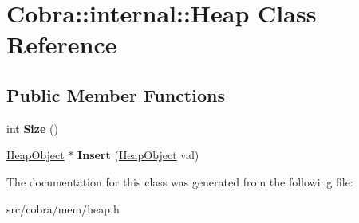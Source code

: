 \hypertarget{class_cobra_1_1internal_1_1_heap}{\section{Cobra\+:\+:internal\+:\+:Heap Class Reference}
\label{class_cobra_1_1internal_1_1_heap}
}
\subsection*{Public Member Functions}
\begin{DoxyCompactItemize}
\item 
\hypertarget{class_cobra_1_1internal_1_1_heap_a42859090edacdd5de263e27711a9eca6}{int {\bfseries Size} ()}\label{class_cobra_1_1internal_1_1_heap_a42859090edacdd5de263e27711a9eca6}

\item 
\hypertarget{class_cobra_1_1internal_1_1_heap_a6110bb56a06dd1873c884c254f87d60e}{\hyperlink{struct_cobra_1_1internal_1_1_heap_object}{Heap\+Object} $\ast$ {\bfseries Insert} (\hyperlink{struct_cobra_1_1internal_1_1_heap_object}{Heap\+Object} val)}\label{class_cobra_1_1internal_1_1_heap_a6110bb56a06dd1873c884c254f87d60e}

\end{DoxyCompactItemize}


The documentation for this class was generated from the following file\+:\begin{DoxyCompactItemize}
\item 
src/cobra/mem/heap.\+h\end{DoxyCompactItemize}
